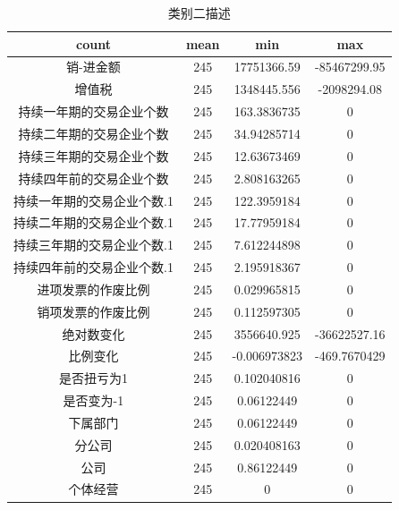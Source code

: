 \documentclass[UTF8]{ctexart}
\begin{document}
\begin{center}
	\begin{longtable}{|c|c|c|c|}
		\caption{类别二描述}
		\label{tab:aaaa}                                                \\
		\hline
		count                      & mean & min          & max          \\ \hline
		销-进金额                  & 245  & 17751366.59  & -85467299.95 \\ \hline
		增值税                     & 245  & 1348445.556  & -2098294.08  \\ \hline
		持续一年期的交易企业个数   & 245  & 163.3836735  & 0            \\ \hline
		持续二年期的交易企业个数   & 245  & 34.94285714  & 0            \\ \hline
		持续三年期的交易企业个数   & 245  & 12.63673469  & 0            \\ \hline
		持续四年前的交易企业个数   & 245  & 2.808163265  & 0            \\ \hline
		持续一年期的交易企业个数.1 & 245  & 122.3959184  & 0            \\ \hline
		持续二年期的交易企业个数.1 & 245  & 17.77959184  & 0            \\ \hline
		持续三年期的交易企业个数.1 & 245  & 7.612244898  & 0            \\ \hline
		持续四年前的交易企业个数.1 & 245  & 2.195918367  & 0            \\ \hline
		进项发票的作废比例         & 245  & 0.029965815  & 0            \\ \hline
		销项发票的作废比例         & 245  & 0.112597305  & 0            \\ \hline
		绝对数变化                 & 245  & 3556640.925  & -36622527.16 \\ \hline
		比例变化                   & 245  & -0.006973823 & -469.7670429 \\ \hline
		是否扭亏为1                & 245  & 0.102040816  & 0            \\ \hline
		是否变为-1                 & 245  & 0.06122449   & 0            \\ \hline
		下属部门                   & 245  & 0.06122449   & 0            \\ \hline
		分公司                     & 245  & 0.020408163  & 0            \\ \hline
		公司                       & 245  & 0.86122449   & 0            \\ \hline
		个体经营                   & 245  & 0            & 0            \\ \hline

\end{longtable}
\end{center}
\end{document}

